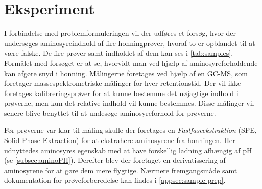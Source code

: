 \chapter{Eksperiment}
I forbindelse med problemformuleringen vil der udføres et forsøg, hvor der undersøges aminosyreindhold af fire honningprøver, hvoraf to er opblandet til at være falske.
De fire prøver samt indholdet af dem kan ses i \cref{tab:samples}.
Formålet med forsøget er at se, hvorvidt man ved hjælp af aminosyreforholdende kan afgøre snyd i honning.
Målingerne foretages ved hjælp af en GC-MS\footnotemark{}, som foretager massespektrometriske målinger for hver retentionstid.
Der vil ikke foretages kalibreringsprøver for at kunne bestemme det nøjagtige indhold i prøverne, men kun det relative indhold vil kunne bestemmes.
Disse målinger vil senere blive benyttet til at undesøge aminosyreforhold for prøverne.

\par Før prøverne var klar til måling skulle der foretages en \emph{Fastfaseekstraktion} (SPE, Solid Phase Extraction) for at ekstrahere aminosyrene fra honningen.
Her udnyttedes aminosyres egenskab med at have forskellig ladning afhængig af pH (se \cref{subsec:aminoPH}).
Derefter blev der foretaget en derivatissering af aminosyrene for at gøre dem mere flygtige.
Nærmere fremgangsmåde samt dokumentation for prøveforberedelse kan findes i \cref{appsec:sample-prep}.
